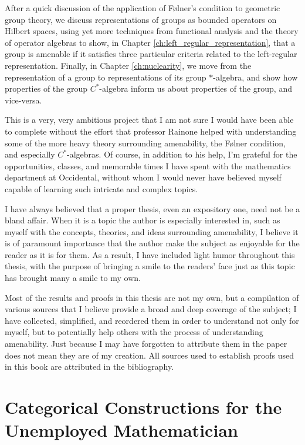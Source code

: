 \documentclass[11pt]{package2}
\begin{document}
After a quick discussion of the application of Følner's condition to geometric group theory, we discuss representations of groups as bounded operators on Hilbert spaces, using yet more techniques from functional analysis and the theory of operator algebras to show, in Chapter \ref{ch:left_regular_representation}, that a group is amenable if it satisfies three particular criteria related to the left-regular representation. Finally, in Chapter \ref{ch:nuclearity}, we move from the representation of a group to representations of its group $\ast$-algebra, and show how properties of the group $C^{\ast}$-algebra inform us about properties of the group, and vice-versa.\newline

This is a very, very ambitious project that I am not sure I would have been able to complete without the effort that professor Rainone helped with understanding some of the more heavy theory surrounding amenability, the Følner condition, and especially $C^{\ast}$-algebras. Of course, in addition to his help, I'm grateful for the opportunities, classes, and memorable times I have spent with the mathematics department at Occidental, without whom I would never have believed myself capable of learning such intricate and complex topics.\newline

I have always believed that a proper thesis, even an expository one, need not be a bland affair. When it is a topic the author is especially interested in, such as myself with the concepts, theories, and ideas surrounding amenability, I believe it is of paramount importance that the author make the subject as enjoyable for the reader as it is for them. As a result, I have included light humor throughout this thesis, with the purpose of bringing a smile to the readers' face just as this topic has brought many a smile to my own.\newline

Most of the results and proofs in this thesis are not my own, but a compilation of various sources that I believe provide a broad and deep coverage of the subject; I have collected, simplified, and reordered them in order to understand not only for myself, but to potentially help others with the process of understanding amenability. Just because I may have forgotten to attribute them in the paper does not mean they are of my creation. All sources used to establish proofs used in this book are attributed in the bibliography.
\chapter{Categorical Constructions for the Unemployed Mathematician}\label{ch:categorical_constructions}

\end{document}
